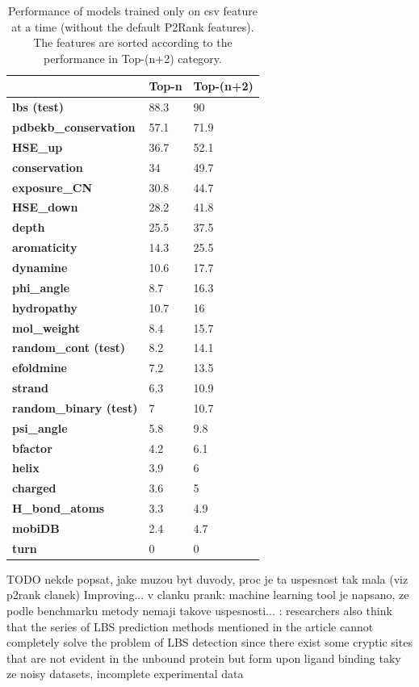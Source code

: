 \begin{table}[]
\centering
\begin{tabular}{lll}
\hline
                              & Top-n & Top-(n+2) \\ \hline
\textbf{lbs (test)}                  & 88.3  & 90        \\
\textbf{pdbekb\_conservation} & 57.1  & 71.9      \\
\textbf{HSE\_up}              & 36.7  & 52.1      \\
\textbf{conservation}         & 34    & 49.7      \\
\textbf{exposure\_CN}         & 30.8  & 44.7      \\
\textbf{HSE\_down}            & 28.2  & 41.8      \\
\textbf{depth}                & 25.5  & 37.5      \\
\textbf{aromaticity}          & 14.3  & 25.5      \\
\textbf{dynamine}             & 10.6  & 17.7      \\
\textbf{phi\_angle}           & 8.7   & 16.3      \\
\textbf{hydropathy}           & 10.7  & 16        \\
\textbf{mol\_weight}          & 8.4   & 15.7      \\
\textbf{random\_cont (test)}         & 8.2   & 14.1      \\
\textbf{efoldmine}            & 7.2   & 13.5      \\
\textbf{strand}               & 6.3   & 10.9      \\
\textbf{random\_binary (test)}       & 7     & 10.7      \\
\textbf{psi\_angle}           & 5.8   & 9.8       \\
\textbf{bfactor}              & 4.2   & 6.1       \\
\textbf{helix}                & 3.9   & 6         \\
\textbf{charged}              & 3.6   & 5         \\
\textbf{H\_bond\_atoms}       & 3.3   & 4.9       \\
\textbf{mobiDB}               & 2.4   & 4.7       \\
\textbf{turn}                 & 0     & 0         \\ \hline
\end{tabular}
\caption{Performance of models trained only on csv feature at a time (without the default P2Rank features). The features are sorted according to the performance in
Top-(n+2) category.}
\label{tab:p2rankCSVOne}
\end{table}

TODO nekde popsat, jake muzou byt duvody, proc je ta uspesnost tak mala
(viz p2rank clanek) Improving...
v clanku prank: machine learning tool je napsano, ze podle benchmarku metody nemaji takove uspesnosti...
\cite{methods} : researchers also think that the series of LBS prediction methods mentioned in the article cannot completely solve the problem of LBS detection since there exist some cryptic sites that are not evident in the unbound protein but form upon ligand binding
taky ze noisy datasets, incomplete experimental data
